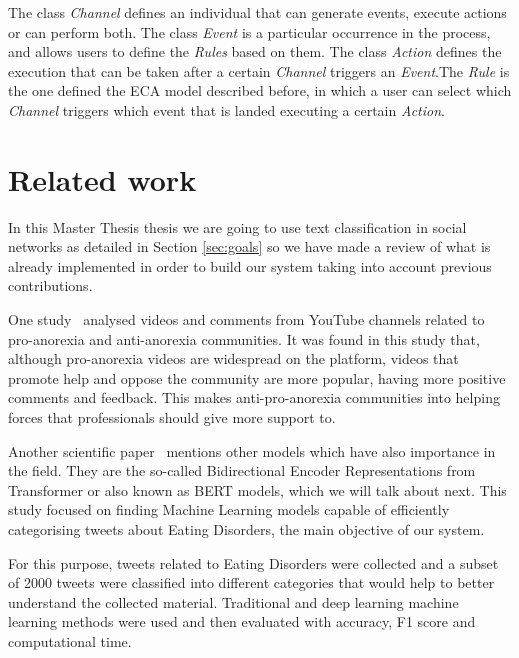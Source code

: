 The class \textit{Channel} defines an individual that can generate events, execute actions or can perform both. The class \textit{Event} is a particular occurrence in the process, and allows users to define the \textit{Rules} based on them. The class \textit{Action} defines the execution that can be taken after a certain \textit{Channel} triggers an \textit{Event}.The \textit{Rule} is the one defined the ECA model described before, in which a user can select which \textit{Channel} triggers which event that is landed executing a certain \textit{Action}.

\section{Related work}
\label{sec:studies}


In this Master Thesis thesis we are going to use text classification in social networks as detailed in Section \ref{sec:goals} so we have made a review of what is already implemented in order to build our system taking into account previous contributions.

One study~\cite{oksanen2015pro} analysed videos and comments from YouTube channels related to pro-anorexia and anti-anorexia communities. It was found in this study that, although pro-anorexia videos are widespread on the platform, videos that promote help and oppose the community are more popular, having more positive comments and feedback. This makes anti-pro-anorexia communities into helping forces that professionals should give more support to.

Another scientific paper~\cite{benitez2022traditional} mentions other models which have also importance in the field. They are the so-called Bidirectional Encoder Representations from Transformer or also known as BERT models, which we will talk about next. This study focused on finding Machine Learning models capable of efficiently categorising tweets about Eating Disorders, the main objective of our system.

For this purpose, tweets related to Eating Disorders were collected and a subset of 2000 tweets were classified into different categories that would help to better understand the collected material. Traditional and deep learning machine learning methods were used and then evaluated with accuracy, F1 score and computational time. 


